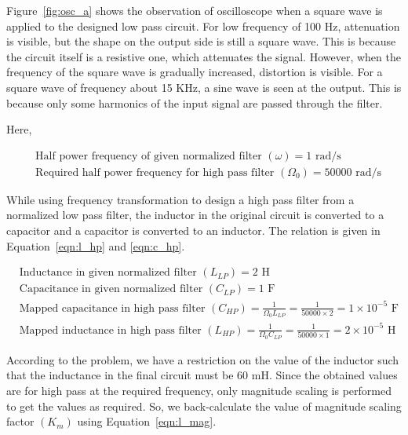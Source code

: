 \documentclass{lab_sheet}
\begin{document}
   Figure~\ref{fig:osc_a} shows the observation of oscilloscope when a square wave is applied to the designed low pass circuit. For low frequency of 100 Hz, attenuation is visible, but the shape on the output side is still a square wave. This is because the circuit itself is a resistive one, which attenuates the signal. However, when the frequency of the square wave is gradually increased, distortion is visible. For a square wave of frequency about 15 KHz, a sine wave is seen at the output. This is because only some harmonics of the input signal are passed through the filter. 
   


Here,
\begin{fleqn}[\parindent]
   \begin{equation*}
      \begin{split}
         &\text{Half power frequency of given normalized filter } (\omega)=1 \text{ rad/s}\\
         &\text{Required half power frequency for high pass filter }(\Omega_0)=50000 \text{ rad/s} 
         \end{split}
      \end{equation*}
\end{fleqn}
While using frequency transformation to design a high pass filter from a normalized low pass filter, the inductor in the original circuit is converted to a capacitor and a capacitor is converted to an inductor. The relation is given in Equation~\ref{eqn:l_hp} and \ref{eqn:c_hp}.
\begin{fleqn}[\parindent]
   \begin{equation*}
      \begin{split}
         &\text{Inductance in given normalized filter } (L_{LP})=2 \text{ H}\\
         &\text{Capacitance in given normalized filter } (C_{LP})=1 \text{ F}\\
         &\text{Mapped capacitance in high pass filter }(C_{HP})=\frac{1}{\Omega_0L_{LP}}=\frac{1}{50000\times2}=1\times10^{-5} \text{ F} \\
         &\text{Mapped inductance in high pass filter }(L_{HP})=\frac{1}{\Omega_0C_{LP}}=\frac{1}{50000\times1}=2\times10^{-5}\text{ H} 
         \end{split}
      \end{equation*}
\end{fleqn}
According to the problem, we have a restriction on the value of the inductor such that the inductance in the final circuit must be 60 mH. Since the obtained values are for high pass at the required frequency, only magnitude scaling is performed to get the values as required. So, we back-calculate the value of magnitude scaling factor $(K_m)$ using Equation~\ref{eqn:l_mag}.
\end{document}
